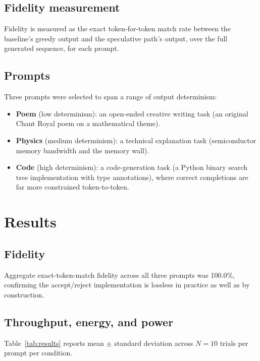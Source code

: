 \documentclass[conference]{IEEEtran}
\begin{document}
\subsection{Fidelity measurement}

Fidelity is measured as the exact token-for-token match rate between the
baseline's greedy output and the speculative path's output, over the full
generated sequence, for each prompt.

\subsection{Prompts}

Three prompts were selected to span a range of output determinism:
\begin{itemize}
\item \textbf{Poem} (low determinism): an open-ended creative writing task
(an original Chant Royal poem on a mathematical theme).
\item \textbf{Physics} (medium determinism): a technical explanation task
(semiconductor memory bandwidth and the memory wall).
\item \textbf{Code} (high determinism): a code-generation task (a Python
binary search tree implementation with type annotations), where correct
completions are far more constrained token-to-token.
\end{itemize}

\section{Results}

\subsection{Fidelity}

Aggregate exact-token-match fidelity across all three prompts was
100.0\%, confirming the accept/reject implementation is lossless
in practice as well as by construction.

\subsection{Throughput, energy, and power}

Table~\ref{tab:results} reports mean $\pm$ standard deviation across
$N{=}10$ trials per prompt per condition.
\end{document}
